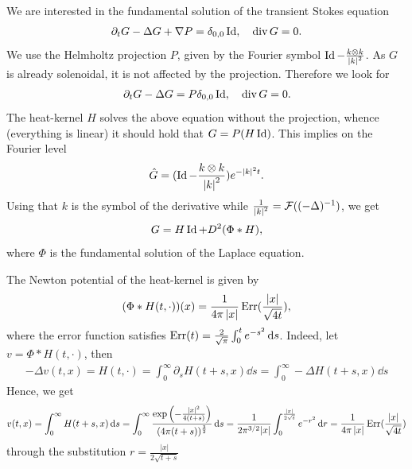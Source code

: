 \documentclass[abstracton, paper=a4, fontsize=11pt,DIV=12,bibliography=totoc]{scrartcl}
\begin{document}
We are interested in the fundamental solution of the transient Stokes equation
\begin{align*}
    \partial_t G-\Delta G+\nabla P=\delta_{0,0}\operatorname{Id}, \quad \operatorname{div} G=0.
\end{align*}
We use the Helmholtz projection $P$, given by the Fourier symbol $\operatorname{Id}-\frac{k\otimes k}{\left\lvert k\right\rvert^2}$. As $G$ is already solenoidal, it is not affected by the projection. Therefore we look for
\begin{align*}
    \partial_t G-\Delta G=P\delta_{0,0}\operatorname{Id}, \quad  \operatorname{div} G=0.
\end{align*}
The heat-kernel $H$ solves the above equation without the projection, whence (everything is linear) it should hold that $G=P(H\operatorname{Id})$. This implies on the Fourier level
\begin{align*}
    \hat G=(\operatorname{Id}-\frac{k\otimes k}{\left\lvert k\right\rvert^2})e^{-\left\lvert k\right\rvert^2t}.
\end{align*}
Using that $k$ is the symbol of the derivative while $\frac{1}{\left\lvert k\right\rvert^2}=\mathcal{F}((-\Delta)^{-1})$, we get
\begin{align*}
    G=H\operatorname{Id}+D^2(\Phi\ast H),
\end{align*}
where $\Phi$ is the fundamental solution of the Laplace equation.

The Newton potential of the heat-kernel is given by 
\begin{align*}
    (\Phi\ast H(t,\cdot))(x)=\frac{1}{4\pi\left\lvert x\right\rvert}\operatorname{Err}(\frac{\left\lvert x\right\rvert}{\sqrt{4t}}),
\end{align*}
where the error function satisfies $\operatorname{Err}(t)= \frac{2}{\sqrt \pi} \int_0^t e^{-s^2}\, \mathrm{d} s$. 
Indeed, let $v = \Phi\ast H(t,\cdot)$, then
\begin{align*}
   -\Delta v(t,x) =   H(t,\cdot) = \int_0^\infty \partial_s H(t +s,x) \dd s = \int_0^\infty - \Delta H(t +s,x) \dd s 
\end{align*}
Hence, we get
\begin{align*}
   v(t,x) =   \int_0^\infty  H(t +s,x) \, \mathrm{d} s = \int_0^\infty \frac{\exp\left(-\frac {|x|^2}{4(t+s)}\right)}{(4 \pi (t+s))^{\frac 32} } \, \mathrm{d} s =  \frac{1}{2 \pi^{3/2} |x|} \int_0^{\frac{|x|}{2 \sqrt t}} e^{-r^2}\, \mathrm{d} r = \frac{1}{4\pi\left\lvert x\right\rvert}\operatorname{Err}(\frac{\left\lvert x\right\rvert}{\sqrt{4t}})
\end{align*}
through the substitution $r = \frac {|x|}{2 \sqrt{t+s}}$
\end{document}
